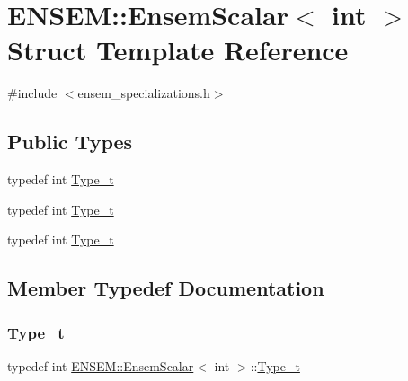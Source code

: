 \hypertarget{structENSEM_1_1EnsemScalar_3_01int_01_4}{}\section{E\+N\+S\+EM\+:\+:Ensem\+Scalar$<$ int $>$ Struct Template Reference}
\label{structENSEM_1_1EnsemScalar_3_01int_01_4}


{\ttfamily \#include $<$ensem\+\_\+specializations.\+h$>$}

\subsection*{Public Types}
\begin{DoxyCompactItemize}
\item 
typedef int \mbox{\hyperlink{structENSEM_1_1EnsemScalar_3_01int_01_4_a41810484239c9a09218b0ca99828cd0a}{Type\+\_\+t}}
\item 
typedef int \mbox{\hyperlink{structENSEM_1_1EnsemScalar_3_01int_01_4_a41810484239c9a09218b0ca99828cd0a}{Type\+\_\+t}}
\item 
typedef int \mbox{\hyperlink{structENSEM_1_1EnsemScalar_3_01int_01_4_a41810484239c9a09218b0ca99828cd0a}{Type\+\_\+t}}
\end{DoxyCompactItemize}


\subsection{Member Typedef Documentation}
\mbox{\label{structENSEM_1_1EnsemScalar_3_01int_01_4_a41810484239c9a09218b0ca99828cd0a}} 
\subsubsection{\texorpdfstring{Type\_t}{Type\_t}\hspace{0.1cm}{\footnotesize\ttfamily [1/3]}}
{\footnotesize\ttfamily typedef int \mbox{\hyperlink{structENSEM_1_1EnsemScalar}{E\+N\+S\+E\+M\+::\+Ensem\+Scalar}}$<$ int $>$\+::\mbox{\hyperlink{structENSEM_1_1EnsemScalar_3_01int_01_4_a41810484239c9a09218b0ca99828cd0a}{Type\+\_\+t}}}

\mbox{\label{structENSEM_1_1EnsemScalar_3_01int_01_4_a41810484239c9a09218b0ca99828cd0a}} 
